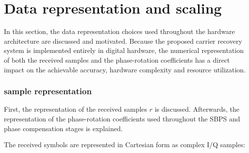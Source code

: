 






\section{Data representation and scaling}

In this section, the data representation choices used throughout the hardware architecture are discussed and motivated.
Because the proposed carrier recovery system is implemented entirely in digital hardware, the numerical representation
of both the received samples and the phase-rotation coefficients has a direct impact on the achievable accuracy, hardware
complexity and resource utilization.

\subsubsection{sample representation}

First, the representation of the received samples $r$ is discussed. Afterwards, the representation of the phase-rotation
coefficients used throughout the \ac{SBPS} and phase compensation stages is explained.

The received symbols are represented in Cartesian form as complex \ac{I/Q} samples:

